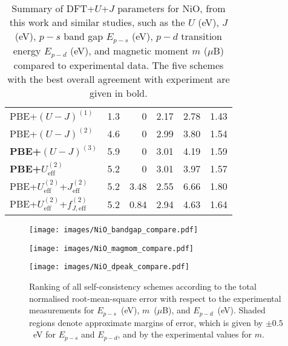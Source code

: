 \begin{table*}[th!]
{\begin{tabular}{lrrrrr}
PBE+$(U-J)^{(1)}$			& 1.3		& 0		&2.17	&2.78	& 1.43\\[0.25em]
PBE+$(U-J)^{(2)}$			& 4.6		& 0		&2.99	&3.80	& 1.54\\[0.25em]
{\bf PBE+$(U-J)^{(3)}$}		& 5.9		& 0		&3.01	&4.19	& 1.59\\[0.25em]
{\bf PBE+$U_\textrm{eff}^{(2)}$}	& 5.2		& 0		&3.01	&3.97	& 1.57\\[0.25em]
PBE+$U_\textrm{eff}^{(2)}$+$J_\textrm{eff}^{(2)}$ 
						& 5.2 	& 3.48	&2.55	&6.66	& 1.80\\[0.25em]
PBE+$U_\textrm{eff}^{(2)}$+$f_{J,\textrm{eff}}^{(2)}$ 
						& 5.2		& 0.84	&2.94	&4.63	& 1.64\\[0.25em]
\hline\hline
\end{tabular}
}
\caption{Summary of DFT+$U$+$J$ parameters for NiO, 
from this work and similar studies,  
such as the $U$ (eV), $J$ (eV), 
$p-s$ band gap $E_{p-s}$ (eV), $p-d$ transition energy $E_{p-d}$ (eV), 
and magnetic moment $m$ ($\mu$B) 
compared to experimental data. 
%
The five schemes with the best overall agreement 
with experiment are given in bold.}
\label{table:multi_electron_results} 
\end{table*}


\newpage
\begin{figure}[th!]
\centering
\begin{subfloat}[]{
\texttt{[image: images/NiO\_bandgap\_compare.pdf]}
}
\end{subfloat}
\begin{subfloat}[]{
\texttt{[image: images/NiO\_magmom\_compare.pdf]}
}
\end{subfloat}
\begin{subfloat}[]{
\texttt{[image: images/NiO\_dpeak\_compare.pdf]}
}
\end{subfloat}
\caption[Ranking of all self-consistency schemes for NiO]
{Ranking of all self-consistency schemes according 
to the total normalised root-mean-square error 
with respect to the experimental measurements for 
$E_{p-s}$~(eV), $m$~($\mu$B), 
and  $E_{p-d}$~(eV).
%
Shaded regions denote 
approximate margins of error, 
which is given by $\pm0.5$~eV 
for $E_{p-s}$ and  $E_{p-d}$, 
and by the experimental 
values for $m$.}
\label{fig:NiO_compare}
\end{figure}
\newpage


